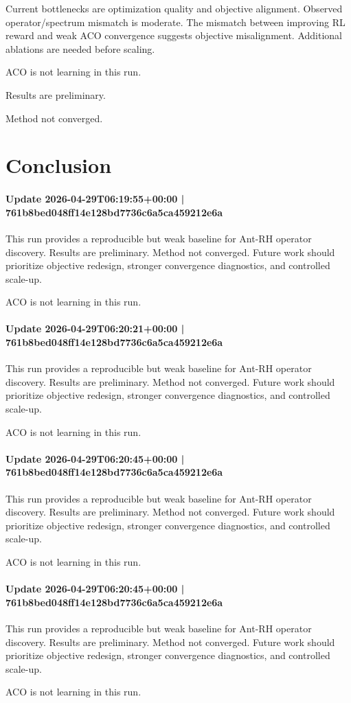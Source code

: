 \documentclass{article}
\begin{document}
Current bottlenecks are optimization quality and objective alignment. Observed operator/spectrum mismatch is moderate. The mismatch between improving RL reward and weak ACO convergence suggests objective misalignment. Additional ablations are needed before scaling.

ACO is not learning in this run.

Results are preliminary.

Method not converged.

\section{Conclusion}
\paragraph{Update 2026-04-29T06:19:55+00:00 | 761b8bed048ff14e128bd7736c6a5ca459212e6a}

This run provides a reproducible but weak baseline for Ant-RH operator discovery. Results are preliminary. Method not converged. Future work should prioritize objective redesign, stronger convergence diagnostics, and controlled scale-up.

ACO is not learning in this run.

\paragraph{Update 2026-04-29T06:20:21+00:00 | 761b8bed048ff14e128bd7736c6a5ca459212e6a}

This run provides a reproducible but weak baseline for Ant-RH operator discovery. Results are preliminary. Method not converged. Future work should prioritize objective redesign, stronger convergence diagnostics, and controlled scale-up.

ACO is not learning in this run.

\paragraph{Update 2026-04-29T06:20:45+00:00 | 761b8bed048ff14e128bd7736c6a5ca459212e6a}

This run provides a reproducible but weak baseline for Ant-RH operator discovery. Results are preliminary. Method not converged. Future work should prioritize objective redesign, stronger convergence diagnostics, and controlled scale-up.

ACO is not learning in this run.

\paragraph{Update 2026-04-29T06:20:45+00:00 | 761b8bed048ff14e128bd7736c6a5ca459212e6a}

This run provides a reproducible but weak baseline for Ant-RH operator discovery. Results are preliminary. Method not converged. Future work should prioritize objective redesign, stronger convergence diagnostics, and controlled scale-up.

ACO is not learning in this run.
\end{document}

